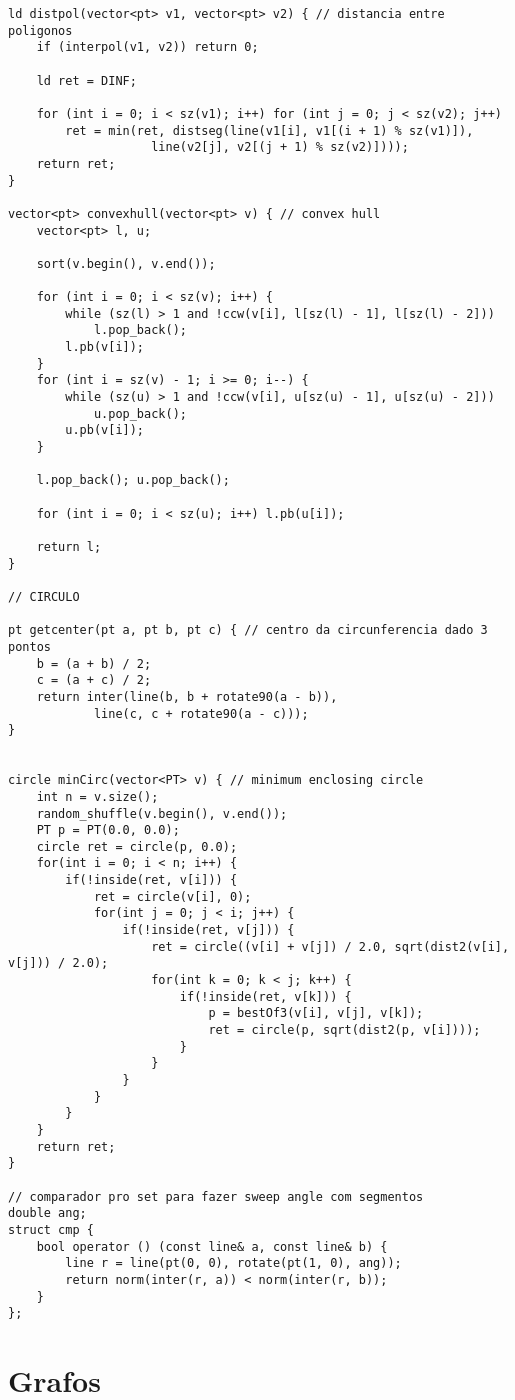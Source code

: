 \documentclass[12pt, a4paper, twoside]{article}
\begin{document}
\begin{lstlisting}
ld distpol(vector<pt> v1, vector<pt> v2) { // distancia entre poligonos
	if (interpol(v1, v2)) return 0;

	ld ret = DINF;

	for (int i = 0; i < sz(v1); i++) for (int j = 0; j < sz(v2); j++)
		ret = min(ret, distseg(line(v1[i], v1[(i + 1) % sz(v1)]),
					line(v2[j], v2[(j + 1) % sz(v2)])));
	return ret;
}

vector<pt> convexhull(vector<pt> v) { // convex hull
	vector<pt> l, u;

	sort(v.begin(), v.end());

	for (int i = 0; i < sz(v); i++) {
		while (sz(l) > 1 and !ccw(v[i], l[sz(l) - 1], l[sz(l) - 2]))
			l.pop_back();
		l.pb(v[i]);
	}
	for (int i = sz(v) - 1; i >= 0; i--) {
		while (sz(u) > 1 and !ccw(v[i], u[sz(u) - 1], u[sz(u) - 2]))
			u.pop_back();
		u.pb(v[i]);
	}

	l.pop_back(); u.pop_back();

	for (int i = 0; i < sz(u); i++) l.pb(u[i]);

	return l;
}

// CIRCULO

pt getcenter(pt a, pt b, pt c) { // centro da circunferencia dado 3 pontos
	b = (a + b) / 2;
	c = (a + c) / 2;
	return inter(line(b, b + rotate90(a - b)),
			line(c, c + rotate90(a - c)));
}


circle minCirc(vector<PT> v) { // minimum enclosing circle
	int n = v.size();
	random_shuffle(v.begin(), v.end());
	PT p = PT(0.0, 0.0);
	circle ret = circle(p, 0.0);
	for(int i = 0; i < n; i++) {
		if(!inside(ret, v[i])) {
			ret = circle(v[i], 0);
			for(int j = 0; j < i; j++) {
				if(!inside(ret, v[j])) {
					ret = circle((v[i] + v[j]) / 2.0, sqrt(dist2(v[i], v[j])) / 2.0);
					for(int k = 0; k < j; k++) {
						if(!inside(ret, v[k])) {
							p = bestOf3(v[i], v[j], v[k]);
							ret = circle(p, sqrt(dist2(p, v[i])));
						}
					}
				}
			}
		}
	}
	return ret;
}

// comparador pro set para fazer sweep angle com segmentos
double ang;
struct cmp {
	bool operator () (const line& a, const line& b) {
		line r = line(pt(0, 0), rotate(pt(1, 0), ang));
		return norm(inter(r, a)) < norm(inter(r, b));
	}
};
\end{lstlisting}



%
%

\section{Grafos}
\end{document}

